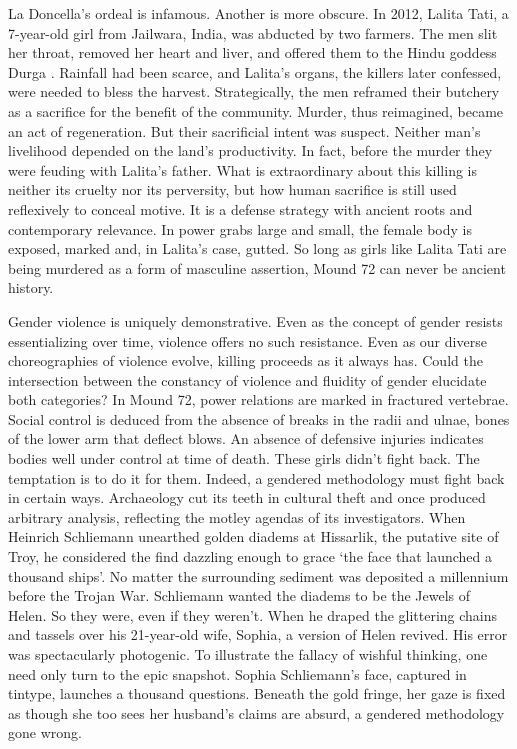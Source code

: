 La Doncella's ordeal is infamous. Another is more obscure. In 2012, Lalita Tati, a 7-year-old girl from Jailwara, India, was abducted by two farmers. The men slit her throat, removed her heart and liver, and offered them to the Hindu goddess Durga \parencite[]{richards2012}. Rainfall had been scarce, and Lalita's organs, the killers later confessed, were needed to bless the harvest. Strategically, the men reframed their butchery as a sacrifice for the benefit of the community. Murder, thus reimagined, became an act of regeneration. But their sacrificial intent was suspect. Neither man's livelihood depended on the land's productivity. In fact, before the murder they were feuding with Lalita's father. What is extraordinary about this killing is neither its cruelty nor its perversity, but how human sacrifice is still used reflexively to conceal motive. It is a defense strategy with ancient roots and contemporary relevance. In power grabs large and small, the female body is exposed, marked and, in Lalita's case, gutted. So long as girls like Lalita Tati are being murdered as a form of masculine assertion, Mound 72 can never be ancient history. 

Gender violence is uniquely demonstrative. Even as the concept of gender resists essentializing over time, violence offers no such resistance. Even as our diverse choreographies of violence evolve, killing proceeds as it always has. Could the intersection between the constancy of violence and fluidity of gender elucidate both categories? In Mound 72, power relations are marked in fractured vertebrae. Social control is deduced from the absence of breaks in the radii and ulnae, bones of the lower arm that deflect blows. An absence of defensive injuries indicates bodies well under control at time of death. These girls didn't fight back. The temptation is to do it for them. Indeed, a gendered methodology must fight back in certain ways. Archaeology cut its teeth in cultural theft and once produced arbitrary analysis, reflecting the motley agendas of its investigators. When Heinrich Schliemann unearthed golden diadems at Hissarlik, the putative site of Troy, he considered the find dazzling enough to grace \enquote*{the face that launched a thousand ships}. No matter the surrounding sediment was deposited a millennium before the Trojan War. Schliemann wanted the diadems to be the Jewels of Helen. So they were, even if they weren't. When he draped the glittering chains and tassels over his 21-year-old wife, Sophia, a version of Helen revived. His error was spectacularly photogenic. To illustrate the fallacy of wishful thinking, one need only turn to the epic snapshot. Sophia Schliemann’s face, captured in tintype, launches a thousand questions. Beneath the gold fringe, her gaze is fixed as though she too sees her husband's claims are absurd, a gendered methodology gone wrong. 


